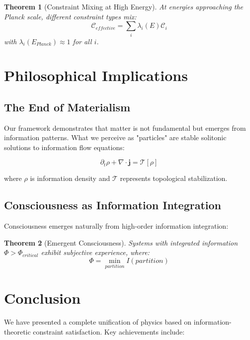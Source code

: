 \documentclass[12pt,a4paper]{article}
\newtheorem{theorem}{Theorem}[section]
\begin{document}
\begin{theorem}[Constraint Mixing at High Energy]
At energies approaching the Planck scale, different constraint types mix:
\begin{equation}
\mathcal{C}_{effective} = \sum_i \lambda_i(E) \mathcal{C}_i
\end{equation}
with $\lambda_i(E_{Planck}) \approx 1$ for all $i$.
\end{theorem}

\section{Philosophical Implications}

\subsection{The End of Materialism}

Our framework demonstrates that matter is not fundamental but emerges from information patterns. What we perceive as "particles" are stable solitonic solutions to information flow equations:

\begin{equation}
\partial_t \rho + \nabla \cdot \mathbf{j} = \mathcal{T}[\rho]
\end{equation}

where $\rho$ is information density and $\mathcal{T}$ represents topological stabilization.

\subsection{Consciousness as Information Integration}

Consciousness emerges naturally from high-order information integration:

\begin{theorem}[Emergent Consciousness]
Systems with integrated information $\Phi > \Phi_{critical}$ exhibit subjective experience, where:
\begin{equation}
\Phi = \min_{partition} I(partition)
\end{equation}
\end{theorem}

\section{Conclusion}

We have presented a complete unification of physics based on information-theoretic constraint satisfaction. Key achievements include:
\end{document}
